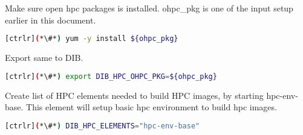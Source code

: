 Make sure open hpc packages is installed. ohpc\_pkg is one of the input setup earlier in this document.

\begin{lstlisting}[language=bash,keywords={}]
[ctrlr](*\#*) yum -y install ${ohpc_pkg}
\end{lstlisting}

Export same to DIB.

\begin{lstlisting}[language=bash,keywords={}]
[ctrlr](*\#*) export DIB_HPC_OHPC_PKG=${ohpc_pkg}
\end{lstlisting}

Create list of HPC elements needed to build HPC images, by starting hpc-env-base. This element will setup basic hpc environment to build hpc images.

\begin{lstlisting}[language=bash,keywords={}]
[ctrlr](*\#*) DIB_HPC_ELEMENTS="hpc-env-base"
\end{lstlisting}
